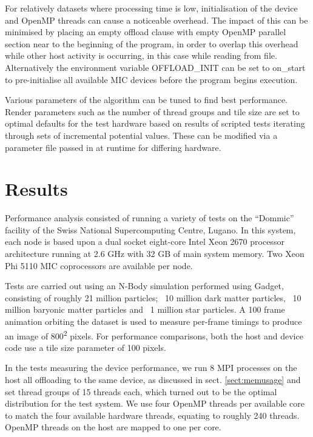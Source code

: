 \documentclass[runningheads,a4paper]{llncs}
\begin{document}
For relatively datasets where processing time is low, initialisation of the device and OpenMP threads can cause a noticeable overhead. 
The impact of this can be minimised by placing an empty offload clause with empty OpenMP parallel section near to the beginning of 
the program, in order to overlap this overhead while other host activity is occurring, in this case while reading from file. 
Alternatively the environment variable OFFLOAD\_INIT can be set to on\_start to pre-initialise all available MIC devices before the 
program begins execution. 

Various parameters of the algorithm can be tuned to find best performance. Render parameters such as the number of 
thread groups and tile size are set to optimal defaults for the test hardware based on results of scripted tests iterating 
through sets of incremental potential values. These can be modified via a parameter file passed in at runtime for differing 
hardware.

\section{Results}
\label{sect:results}

Performance analysis consisted of running a variety of tests on the “Dommic” facility of the Swiss National Supercomputing Centre, 
Lugano. In this system, each node is based upon a dual socket eight-core Intel Xeon 2670 processor architecture running at 2.6 GHz 
with 32 GB of main system memory. Two Xeon Phi 5110 MIC coprocessors are available per node. 

Tests are carried out using an N-Body simulation performed using Gadget, consisting of roughly 21 million 
particles;  ~10 million dark matter particles, ~10 million baryonic matter particles and ~1 million star particles. 
A 100 frame animation orbiting the dataset is used to measure per-frame timings to produce an image of 800\textsuperscript{2} pixels. 
For performance comparisons, both the host and device code use a tile size parameter of 100 pixels.

In the tests measuring the device performance, we run 8 MPI processes on the host all offloading to the same device, 
as discussed in sect. \ref{sect:memusage} and set thread groups of 15 threads each, which turned out to be the optimal distribution 
for the test system. We use four OpenMP threads per available core to match the four available hardware threads, equating to roughly 240 threads.
OpenMP threads on the host are mapped to one per core.
\end{document}
